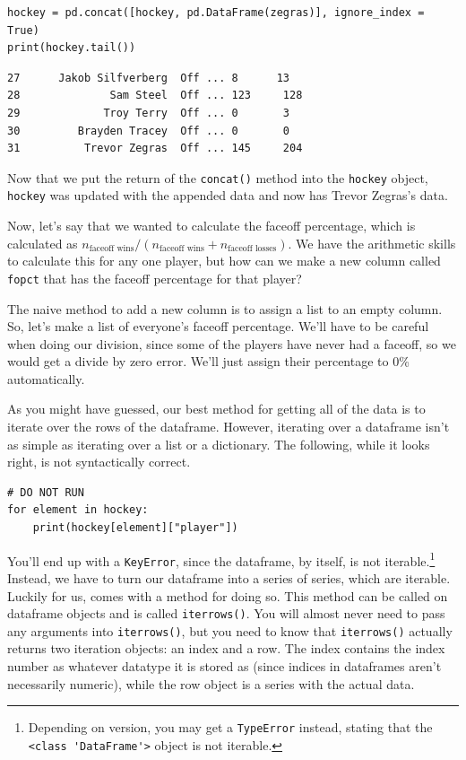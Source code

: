 \begin{lstlisting}[style=pippython]
hockey = pd.concat([hockey, pd.DataFrame(zegras)], ignore_index = True)
print(hockey.tail())
\end{lstlisting}
\begin{lstlisting}[style=none]
27      Jakob Silfverberg  Off ... 8      13
28              Sam Steel  Off ... 123     128
29             Troy Terry  Off ... 0       3
30         Brayden Tracey  Off ... 0       0
31          Trevor Zegras  Off ... 145     204
\end{lstlisting}
Now that we put the return of the \verb|concat()| method into the \verb|hockey| object, \verb|hockey| was updated with the appended data and now has Trevor Zegras's data.\par
Now, let's say that we wanted to calculate the faceoff percentage, which is calculated as $n_\text{faceoff wins}/(n_\text{faceoff wins} + n_\text{faceoff losses})$. We have the arithmetic skills to calculate this for any one player, but how can we make a new column called \verb|fopct| that has the faceoff percentage for that player?\par
The naive method to add a new column is to assign a list to an empty column. So, let's make a list of everyone's faceoff percentage. We'll have to be careful when doing our division, since some of the players have never had a faceoff, so we would get a divide by zero error. We'll just assign their percentage to 0\% automatically.\par
As you might have guessed, our best method for getting all of the data is to iterate over the rows of the dataframe. However, iterating over a dataframe isn't as simple as iterating over a list or a dictionary. The following, while it looks right, is not syntactically correct.\par
\begin{lstlisting}[style=pippython]
# DO NOT RUN
for element in hockey:
	print(hockey[element]["player"])
\end{lstlisting}
You'll end up with a \verb|KeyError|, since the dataframe, by itself, is not iterable.\cprotect\footnote{Depending on  version, you may get a \verb|TypeError| instead, stating that the \verb|<class 'DataFrame'>| object is not iterable.} Instead, we have to turn our dataframe into a series of series, which are iterable. Luckily for us,  comes with a method for doing so. This method can be called on dataframe objects and is called \verb|iterrows()|. You will almost never need to pass any arguments into \verb|iterrows()|, but you need to know that \verb|iterrows()| actually returns two iteration objects: an index and a row. The index contains the index number as whatever datatype it is stored as (since indices in dataframes aren't necessarily numeric), while the row object is a series with the actual data.\par
